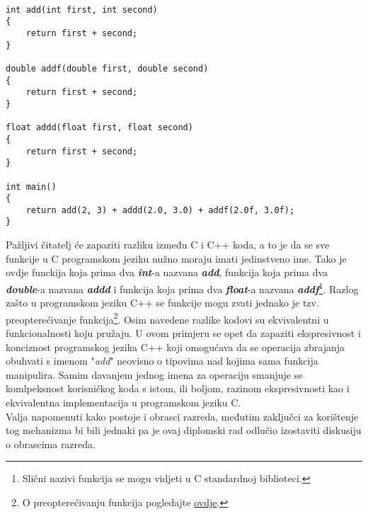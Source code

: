\lstset{language=C, tabsize=2, frame=single, breaklines=true}
\begin{lstlisting}

int add(int first, int second)
{
    return first + second;
}

double addf(double first, double second)
{
    return first + second;
}

float addd(float first, float second)
{
    return first + second;
}

int main()
{
    return add(2, 3) + addd(2.0, 3.0) + addf(2.0f, 3.0f);
}
\end{lstlisting}
Pažljivi čitatelj će zapaziti razliku između C i C++ koda, a to je da se sve funkcije u C programskom jeziku nužno moraju imati jedinstveno ime. Tako je ovdje funckija koja prima dva \textbf{\textit{int}}-a nazvana \textbf{\textit{add}}, funkcija koja prima dva \textbf{\textit{double}}-a nazvana \textbf{\textit{addd}} i funkcija koja prima dva \textbf{\textit{float}}-a nazvana \textbf{\textit{addf}}\footnote{Slični nazivi funkcija se mogu vidjeti u C standardnoj biblioteci.}. Razlog zašto u programskom jeziku C++ se funkcije mogu zvati jednako je tzv. preopterećivanje funkcija\footnote{O preopterećivanju funkcija pogledajte \hyperref[subsection:functionOverloading]{ovdje}.}. Osim navedene razlike kodovi su ekvivalentni u funkcionalnosti koju pružaju. U ovom primjeru se opet da zapaziti ekspresivnost i konciznost programskog jezika C++ koji omogućava da se operacija zbrajanja obuhvati s imenom "\textit{add}" neovisno o tipovima nad kojima sama funkcija manipulira. Samim davanjem jednog imena za operaciju smanjuje se komlpeksnost korisničkog koda s istom, ili boljom, razinom ekspresivnosti kao i ekvivalentna implementacija u programskom jeziku C. \\ 
Valja napomenuti kako postoje i obrasci razreda, međutim zaključci za korištenje tog mehanizma bi bili jednaki pa je ovaj diplomski rad odlučio izostaviti diskusiju o obrascima razreda.

